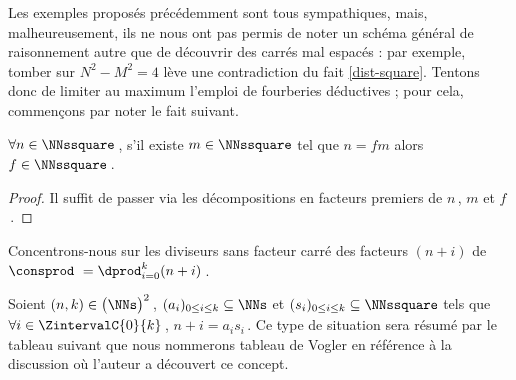 \leavevmode
\smallskip

Les exemples proposés précédemment sont tous sympathiques, mais, malheureusement, ils ne nous ont pas permis de noter un schéma général de raisonnement autre que de découvrir des carrés mal espacés : par exemple, tomber sur $N^2 - M^2 = 4$ lève une contradiction du fait \ref{dist-square}.
Tentons donc de limiter au maximum l'emploi de fourberies déductives ; pour cela, commençons par noter le fait suivant.


\begin{fact} \label{facto-square}
	$\forall n \in \NNssquare$\,, s'il existe $m \in \NNssquare$ tel que $n =  f m$ alors $f  \in \NNssquare$\,.
\end{fact}


\begin{proof}
	Il suffit de passer via les décompositions en facteurs premiers de $n$\,, $m$ et $f$\,.
\end{proof}




Concentrons-nous sur les diviseurs sans facteur carré des facteurs $(n + i)$ de $\consprod\ = \dprod_{i = 0}^{k} (n + i)$\,. 


\begin{defi}
	Soient $(n, k) \in \big( \NNs \big)^2$\,,
	$( a_i )_{0 \leq i \leq k} \subseteq \NNs$
	et
	$( s_i )_{0 \leq i \leq k} \subseteq \NNssquare$
	tels que 
	$\forall i \in \ZintervalC{0}{k}$\,, $n + i = a_i s_i$\,.
	Ce type de situation sera résumé par le tableau suivant que nous nommerons tableau de Vogler en référence à la discussion où l'auteur a découvert ce concept.

	\begin{center}
	\end{center}
\end{defi}





